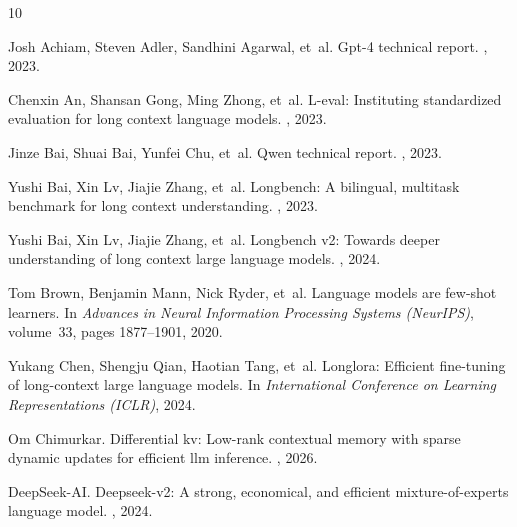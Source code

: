 \documentclass[11pt,a4paper]{article}
\begin{document}
\clearpage

\begingroup
\footnotesize
\begin{thebibliography}{10}
\setlength{\itemsep}{0.0pt}
\setlength{\parsep}{0.0pt}
\setlength{\parskip}{0.0pt}

Josh Achiam, Steven Adler, Sandhini Agarwal, et~al.
\newblock Gpt-4 technical report.
, 2023.

Chenxin An, Shansan Gong, Ming Zhong, et~al.
\newblock L-eval: Instituting standardized evaluation for long context language models.
, 2023.

Jinze Bai, Shuai Bai, Yunfei Chu, et~al.
\newblock Qwen technical report.
, 2023.

Yushi Bai, Xin Lv, Jiajie Zhang, et~al.
\newblock Longbench: A bilingual, multitask benchmark for long context understanding.
, 2023.

Yushi Bai, Xin Lv, Jiajie Zhang, et~al.
\newblock Longbench v2: Towards deeper understanding of long context large language models.
, 2024.

Tom Brown, Benjamin Mann, Nick Ryder, et~al.
\newblock Language models are few-shot learners.
\newblock In {\em Advances in Neural Information Processing Systems (NeurIPS)}, volume~33, pages 1877--1901, 2020.

Yukang Chen, Shengju Qian, Haotian Tang, et~al.
\newblock Longlora: Efficient fine-tuning of long-context large language models.
\newblock In {\em International Conference on Learning Representations (ICLR)}, 2024.

Om Chimurkar.
\newblock Differential kv: Low-rank contextual memory with sparse dynamic updates for efficient llm inference.
, 2026.

DeepSeek-AI.
\newblock Deepseek-v2: A strong, economical, and efficient mixture-of-experts language model.
, 2024.


\end{thebibliography}
\end{document}
